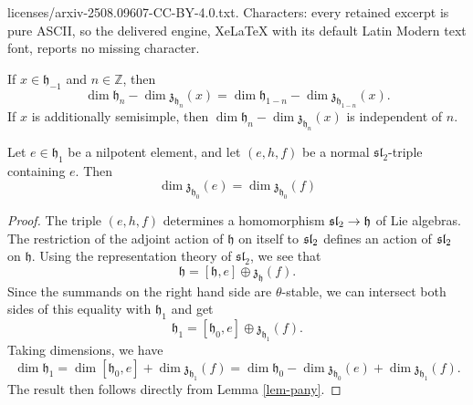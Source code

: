 \documentclass[10pt,a4paper]{amsart}
\newcommand{\Z}{\mathbb{Z}}
\newcommand{\frakh}{\mathfrak h}
\newcommand{\fraksl}{\mathfrak{sl}}
\newcommand{\frakz}{\mathfrak z}
\begin{document}
licenses/arxiv-2508.09607-CC-BY-4.0.txt. Characters: every retained excerpt is pure ASCII, so the delivered engine, XeLaTeX with its default Latin Modern text font, reports no missing character.
\begin{lemma}\label{lem-pany}
If $x \in \frakh_{-1}$ and $n\in \Z$, then 
\begin{equation*}
    \dim \frakh_n - \dim \frakz_{\frakh_n}(x) = \dim \frakh_{1-n} - \dim \frakz_{\frakh_{1 - n}}(x).
\end{equation*}
If $x$ is additionally semisimple, then $\dim \frakh_n - \dim \frakz_{\frakh_n}(x)$ is independent of $n$.
\end{lemma}

\begin{lemma}\label{lem-ef-centralizer} 
Let $e \in \frakh_1$ be a nilpotent element, and let $(e, h, f)$ be a normal $\fraksl_2$-triple containing $e$. Then 
\begin{equation*}
\dim \frakz_{\frakh_0}(e) = \dim \frakz_{\frakh_0}(f)
\end{equation*}
\end{lemma}

\begin{proof}
The triple $(e,h,f)$ determines a homomorphism $\frak{sl}_2\rightarrow \frakh$ of Lie algebras.
The restriction of the adjoint action of $\frakh$ on itself to $\frak{sl}_2$ defines an action of $\frak{sl}_2$ on $\frakh$.
Using the representation theory of $\fraksl_2$, we see that 
\begin{equation*}
\frakh = [\frakh, e] \oplus \frakz_{\frakh}(f).
\end{equation*}
Since the summands on the right hand side are $\theta$-stable, we can intersect both sides of this equality with $\frakh_1$ and get
\begin{equation*}
\frakh_1 = [\frakh_0, e] \oplus \frakz_{\frakh_1}(f).
\end{equation*}
Taking dimensions, we have
\begin{equation*}
\dim \frakh_1 = \dim [\frakh_0,e] + \dim\frakz_{\frakh_1}(f) =  \dim \frakh_0 - \dim \frakz_{\frakh_0}(e) + \dim \frakz_{\frakh_1}(f). 
\end{equation*}
The result then follows directly from Lemma \ref{lem-pany}.
\end{proof}
\end{document}
